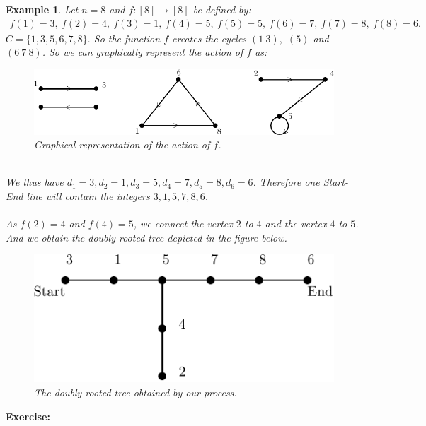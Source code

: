\documentclass[12pt,a4paper]{article}
\newtheorem{exmp}{Example}[section]
\theoremstyle{definition}
\begin{document}
\begin{exmp} Let $n=8$ and $f:[8] \to [8]$ be defined by: 
\begin{align*}
f(1)=3, \ f(2)=4, \ f(3)=1, \ f(4)=5, \ f(5)=5, \ f(6)=7, \ f(7)=8, \ f(8)=6.
\end{align*}
$C= \{1,3,5,6,7,8\}.$ So the function $f$ creates the cycles $(1 \ 3),$ $(5)$ and $(6 \ 7 \ 8)$. So we can graphically represent the action of $f$ as:
\begin{figure}[hbtp]
\centering
\includegraphics[scale=1]{images/graph28.pdf}
\caption{Graphical representation of the action of $f$.}
\end{figure}
\\
We thus have $d_1=3, d_2=1,  d_3=5, d_4=7, d_5=8, d_6=6$. Therefore one Start-End line will contain the integers $3,1,5,7,8,6$. \\\\
As $f(2)=4$ and $f(4)=5$, we connect the vertex $2$ to $4$ and the vertex $4$ to $5$. And we obtain the doubly rooted tree depicted in the figure below.
\begin{figure}[hbtp]
\centering
\includegraphics[scale=1]{images/graph29.pdf}
\caption{The doubly rooted tree obtained by our process.}
\end{figure}
\end{exmp}
\newpage 
\textbf{Exercise:}
\end{document}

